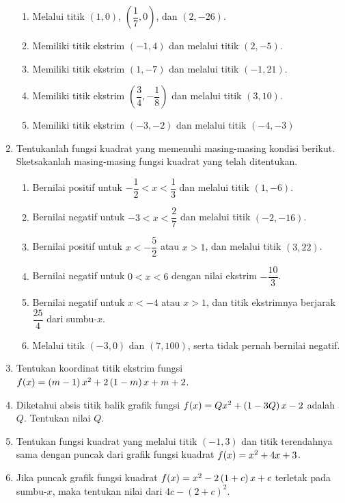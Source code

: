 \begin{enumerate}[topsep=0pt]
\begin{enumerate}
				\item Melalui titik $ \left(1, 0\right) $, $ \left(\dfrac{1}{7}, 0\right) $, dan $ \left(2, -26\right) $.
				\item Memiliki titik ekstrim $ \left(-1, 4\right) $ dan melalui titik $ \left(2, -5\right) $.
				\item Memiliki titik ekstrim $ \left(1, -7\right) $ dan melalui titik $ \left(-1, 21\right) $.
				\item Memiliki titik ekstrim $ \left(\dfrac{3}{4}, -\dfrac{1}{8}\right) $ dan melalui titik $ \left(3, 10\right) $.
				\item Memiliki titik ekstrim $ \left(-3, -2\right) $ dan melalui titik $ \left(-4, -3\right) $
			\end{enumerate}
			\item Tentukanlah fungsi kuadrat yang memenuhi masing-masing kondisi berikut. Sketsakanlah masing-masing fungsi kuadrat yang telah ditentukan.
			\begin{enumerate}
				\item Bernilai positif untuk $ -\dfrac{1}{2} < x < \dfrac{1}{3} $ dan melalui titik $ \left(1, -6\right) $.
				\item Bernilai negatif untuk $ -3 < x < \dfrac{2}{7} $ dan melalui titik $ \left(-2, -16\right) $.
				\item Bernilai positif untuk $ x < -\dfrac{5}{2} $ atau $ x > 1 $, dan melalui titik $ \left(3, 22\right) $.
				\item Bernilai negatif untuk $ 0 < x < 6 $ dengan nilai ekstrim $ -\dfrac{10}{3} $.
				\item Bernilai negatif untuk $ x < -4 $ atau $ x > 1 $, dan titik ekstrimnya berjarak $ \dfrac{25}{4} $ dari sumbu-$ x $.
				\item Melalui titik $ \left(-3, 0\right) $ dan $ \left(7, 100\right) $, serta tidak pernah bernilai negatif.
			\end{enumerate}
			\item Tentukan koordinat titik ekstrim fungsi $ \mathop{}\!{f}{\left({x}\right)} = \left(m - 1\right)x^{2} + 2\left(1 - m\right)x + m + 2 $.
			\item Diketahui absis titik balik grafik fungsi $ \mathop{}\!{f}{\left({x}\right)} = Qx^{2} + \left(1 - 3Q\right)x - 2 $ adalah $ Q $. Tentukan nilai $ Q $.
			\item Tentukan fungsi kuadrat yang melalui titik $ \left(-1, 3\right) $ dan titik terendahnya sama dengan puncak dari grafik fungsi kuadrat $ \mathop{}\!{f}{\left({x}\right)} = x^{2} + 4x + 3 $.
			\item Jika puncak grafik fungsi kuadrat $ \mathop{}\!{f}{\left({x}\right)} = x^{2} - 2\left(1 + c\right)x + c $ terletak pada sumbu-$ x $, maka tentukan nilai dari $ 4c - \left(2 + c\right)^{2} $.

\end{enumerate}
